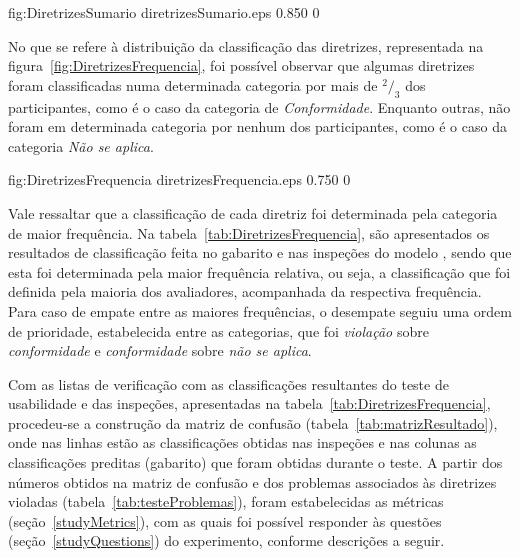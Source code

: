        {fig:DiretrizesSumario}
       {diretrizesSumario.eps}
       {0.850}
       {0}

No  que se  refere  à distribuição  da  classificação das  diretrizes,
representada  na  figura~\ref{fig:DiretrizesFrequencia}, foi  possível
observar que  algumas diretrizes foram  classificadas numa determinada
categoria  por mais de  $^2/_3$ dos  participantes, como  é o  caso da
categoria  de  {\em  Conformidade}.   Enquanto outras,  não  foram  em
determinada categoria por  nenhum dos participantes, como é  o caso da
categoria {\em Não se aplica}.

       {fig:DiretrizesFrequencia}
       {diretrizesFrequencia.eps}
       {0.750}
       {0}

Vale ressaltar  que a classificação  de cada diretriz  foi determinada
pela       categoria        de       maior       frequência.        Na
tabela~\ref{tab:DiretrizesFrequencia}, são  apresentados os resultados
de classificação feita no gabarito  e nas inspeções do modelo \aladim,
sendo  que esta  foi determinada  pela maior  frequência  relativa, ou
seja, a  classificação que foi definida pela  maioria dos avaliadores,
acompanhada da  respectiva frequência.  Para  caso de empate  entre as
maiores  frequências,  o desempate  seguiu  uma  ordem de  prioridade,
estabelecida entre  as categorias, que  foi {\em violação}  sobre {\em
  conformidade} e {\em conformidade} sobre {\em não se aplica}.

Com  as listas  de verificação  com as  classificações  resultantes do
teste    de   usabilidade   e    das   inspeções,    apresentadas   na
tabela~\ref{tab:DiretrizesFrequencia},  procedeu-se  a  construção  da
matriz de confusão (tabela~\ref{tab:matrizResultado}), onde nas linhas
estão  as  classificações  obtidas  nas  inspeções e  nas  colunas  as
classificações preditas (gabarito) que  foram obtidas durante o teste.
A partir  dos números  obtidos na matriz  de confusão e  dos problemas
associados  às diretrizes  violadas (tabela~\ref{tab:testeProblemas}),
foram  estabelecidas as  métricas  (seção~\ref{studyMetrics}), com  as
quais foi possível  responder às questões (seção~\ref{studyQuestions})
do experimento, conforme descrições a seguir.

